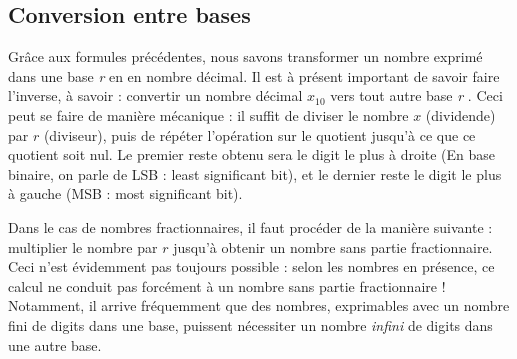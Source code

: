 \subsection{Conversion entre bases}
Grâce aux formules précédentes, nous savons transformer un nombre exprimé dans une base {\it r} en en nombre décimal.
Il est à présent important de savoir faire l'inverse, à savoir : convertir un nombre décimal $x_{10}$ vers tout autre base {\it r} .
Ceci peut se faire de manière mécanique : il suffit de diviser le nombre $x$ (dividende) par $r$ (diviseur), puis de répéter
l'opération sur le quotient jusqu'à ce que ce quotient soit nul. Le premier reste obtenu sera le digit
le plus à droite (En base  binaire, on parle de LSB : least significant bit), et le dernier reste  le digit le plus à gauche
(MSB : most significant bit).

Dans le cas de nombres fractionnaires, il faut procéder de la manière suivante : multiplier le nombre par $r$ jusqu'à obtenir
un nombre sans partie fractionnaire. Ceci n'est évidemment pas toujours possible : selon les nombres en présence, ce calcul ne conduit pas
forcément à un nombre sans partie fractionnaire ! Notamment, il arrive fréquemment que des nombres, exprimables avec un nombre fini de digits dans une base,
puissent nécessiter un nombre {\it infini} de digits dans une autre base.

